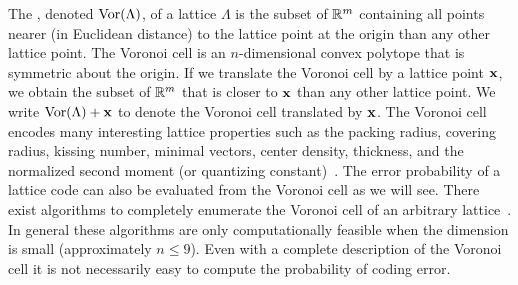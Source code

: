 \documentclass[journal]{IEEEtran}
\begin{document}
The , denoted $\operatorname{Vor}(\Lambda)$, of a lattice $\Lambda$ is the subset of ${\mathbb R}^m$ containing all points nearer (in Euclidean distance) to the lattice point at the origin than any other lattice point. The Voronoi cell is an $n$-dimensional convex polytope that is symmetric about the origin.  If we translate the Voronoi cell by a lattice point $\mathbf{x}$, we obtain the subset of ${\mathbb R}^m$ that is closer to $\mathbf{x}$ than any other lattice point.  We write $\operatorname{Vor}(\Lambda) + \mathbf{x}$ to denote the Voronoi cell translated by $\mathbf{x}$.
The Voronoi cell encodes many interesting lattice properties such as the packing radius, covering radius, kissing number, minimal vectors, center density, thickness, and the normalized second moment (or quantizing constant)~\cite{Viterbo_diamond_cutting_1996, SPLAG}. The error probability of a lattice code can also be evaluated from the Voronoi cell as we will see.  There exist algorithms to completely enumerate the Voronoi cell of an arbitrary lattice~\cite{Viterbo_diamond_cutting_1996,Sikiric_complex_algs_vor_cells_2009,Sikiric_vor_reduction_covering_2008,Valentin2003_coverings_tilings_low_dimension}.  In general these algorithms are only computationally feasible when the dimension is small (approximately $n \leq 9$).  Even with a complete description of the Voronoi cell it is not necessarily easy to compute the probability of coding error.
\end{document}
